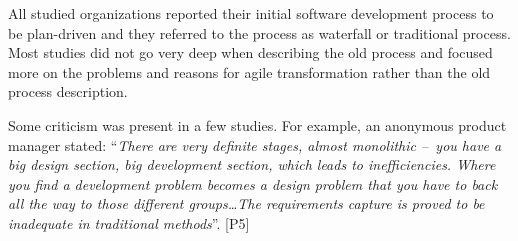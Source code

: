 All studied organizations reported their initial software development
process to be plan-driven and they referred to the process as waterfall
or traditional process. Most studies did not go very deep when
describing the old process and focused more on the problems and reasons
for agile transformation rather than the old process description.

Some criticism was present in a few studies. For example, an anonymous
product manager stated: ``\textit{There are very definite stages, almost
monolithic – you have a big design section, big development section,
which leads to inefficiencies. Where you find a development problem
becomes a design problem that you have to back all the way to those
different groups\ldots The requirements capture is proved to be inadequate
in traditional methods}''. [P5]
